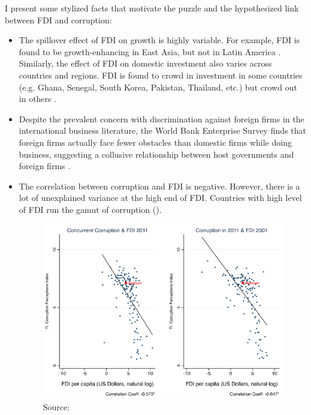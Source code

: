 I present some stylized facts that motivate the puzzle and the hypothesized link between FDI and corruption:

\begin{itemize}
	\item The spillover effect of FDI on growth is highly variable. For example, FDI is found to be growth-enhancing in East Asia, but not in Latin America \citep{Zhang2001}. Similarly, the effect of FDI on domestic investment also varies across countries and regions. FDI is found to crowd in investment in some countries (e.g. Ghana, Senegal, South Korea, Pakistan, Thailand, etc.) but crowd out in others \citep{Agosin2005}.
	
	\item Despite the prevalent concern with discrimination against foreign firms in the international business literature, the World Bank Enterprise Survey finds that foreign firms actually face fewer obstacles than domestic firms while doing business, suggesting a collusive relationship between host governments and foreign firms \citep{Batra2003}.
	
	\item The correlation between corruption and FDI is negative. However, there is a lot of unexplained variance at the high end of FDI. Countries with high level of FDI run the gamut of corruption ().
	
	\begin{figure}[!ht]
	\includegraphics[width=\textwidth, height=\textheight,keepaspectratio]{../figure/fdi_corruption}
	\caption{Source: \citep{Malesky2015}}
	\label{fig:fdi_corruption}
	\end{figure}
\end{itemize}
